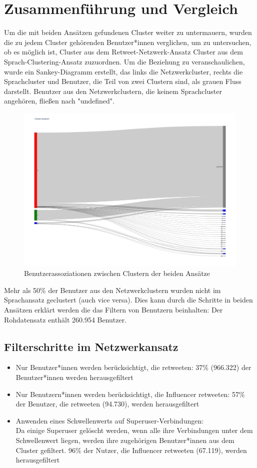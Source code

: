 \chapter{Zusammenführung und Vergleich}
\label{chap:vergleich}
Um die mit beiden Ansätzen gefundenen Cluster weiter zu untermauern, wurden die zu jedem Cluster gehörenden Benutzer*innen verglichen, um zu untersuchen, ob es möglich ist, Cluster aus dem Retweet-Netzwerk-Ansatz Cluster aus dem Sprach-Clustering-Ansatz zuzuordnen.
Um die Beziehung zu veranschaulichen, wurde ein Sankey-Diagramm erstellt, das links die Netzwerkcluster, rechts die Sprachcluster und Benutzer, die Teil von zwei Clustern sind, als grauen Fluss darstellt. Benutzer aus den Netzwerkclustern, die keinem Sprachcluster angehören, fließen nach "undefined".
\begin{figure}[h!]
	\centering
	\includegraphics[width=0.7\linewidth]{images/VergleichUndefined}
	\caption{Benutzerassoziationen zwischen Clustern der beiden Ansätze}
	\label{fig:vergleichundefined}
\end{figure}
Mehr als 50\% der Benutzer aus den Netzwerkclustern wurden nicht im Sprachansatz geclustert (auch vice versa).
Dies kann durch die Schritte in beiden Ansätzen erklärt werden die das Filtern von Benutzern beinhalten:
Der Rohdatensatz enthält 260.954 Benutzer.
\section{Filterschritte im Netzwerkansatz}
\begin{itemize}
	\item Nur Benutzer*innen werden berücksichtigt, die retweeten: 37\% (966.322) der Benutzer*innen werden herausgefiltert
	\item Nur Benutzern*innen werden berücksichtigt, die Influencer retweeten: 57\% der Benutzer, die retweeten (94.730), werden herausgefiltert
	\item Anwenden eines Schwellenwerts auf Superuser-Verbindungen:\\
	Da einige Superuser gelöscht werden, wenn alle ihre Verbindungen unter dem Schwellenwert liegen, werden ihre zugehörigen Benutzer*innen aus dem Cluster gefiltert. 96\% der Nutzer, die Influencer retweeten (67.119), werden herausgefiltert
\end{itemize}
